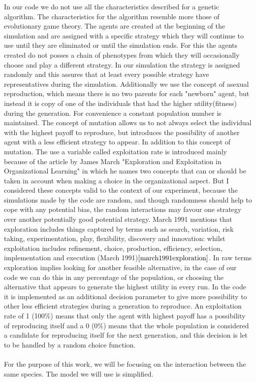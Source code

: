 \documentclass{article}
\begin{document}
In our code we do not use all the characteristics described for a genetic algorithm. The characteristics for the algorithm resemble more those of evolutionary game theory. The agents are created at the beginning of the simulation and are assigned with a specific strategy which they will continue to use until they are eliminated or until the simulation ends. For this the agents created do not posses a chain of phenotypes from which they will occasionally choose and play a different strategy. In our simulation the strategy is assigned randomly and this assures that at least every possible strategy have representatives during the simulation. Additionally we use the concept of asexual reproduction, which means there is no two parents for each "newborn" agent, but instead it is copy of one of the individuals that had the higher utility(fitness) during the generation. For convenience a constant population number is maintained. The concept of mutation allows us to not always select the individual with the highest payoff to reproduce, but introduces the possibility of another agent with a less efficient strategy to appear. In addition to this concept of mutation. The use a variable called exploitation rate is introduced mainly because of the article by James March "Exploration and Exploitation in Organizational Learning" in which he names two concepts that can or should be taken in account when making a choice in the organizational aspect. But I considered these concepts valid to the context of our experiment, because the simulations made by the code are random, and though randomness should help to cope with any potential bias, the random interactions may favour one strategy over another potentially good potential strategy. March 1991 mentions that exploration includes things captured by terms such as search, variation, risk taking, experimentation, play, flexibility, discovery and innovation: whilst exploitation includes refinement, choice, production, efficiency, selection, implementation and execution (March 1991)$\cite{march1991exploration}$. In raw terms exploration implies looking for another feasible alternative, in the case of our code we can do this in any percentage of the population, or choosing the alternative that appears to generate the highest utility in every run. In the code it is implemented as  an additional decision parameter to give more possibility to other less efficient strategies during a generation to reproduce. An exploitation rate of 1 (100\%) means that only the agent with highest payoff has a possibility of reproducing itself and a 0 (0\%) means that the whole population is considered a candidate for reproducing itself for the next generation, and this decision is let to be handled by a random choice function. 
\\\\For the purpose of this work, we will be focusing on the interaction between the same species. The model we will use is simplified.
\end{document}
